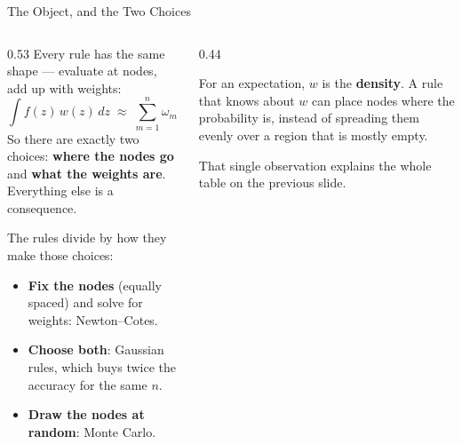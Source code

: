 \begin{frame}{The Object, and the Two Choices}
\begin{columns}[T]
\begin{column}{0.53\textwidth}
\small
Every rule has the same shape --- evaluate at nodes, add up with weights:
\[
  \int f(z)\,w(z)\,dz \;\approx\; \sum_{m=1}^{n} \omega_m\, f(z_m).
\]
So there are exactly two choices: \textbf{where the nodes go} and \textbf{what the weights are}. Everything else is a consequence.
\medskip

The rules divide by how they make those choices:
\begin{itemize}\footnotesize
  \item \textbf{Fix the nodes} (equally spaced) and solve for weights: Newton--Cotes.
  \item \textbf{Choose both}: Gaussian rules, which buys twice the accuracy for the same $n$.
  \item \textbf{Draw the nodes at random}: Monte Carlo.
\end{itemize}
\end{column}
\begin{column}{0.44\textwidth}
\begin{conceptbox}[title=\textbf{$w$ is the weight, and it matters}]\small
For an expectation, $w$ is the \textbf{density}. A rule that knows about $w$ can place nodes where the probability is, instead of spreading them evenly over a region that is mostly empty.
\end{conceptbox}
\medskip
\begin{examplebox}\footnotesize
That single observation explains the whole table on the previous slide.
\end{examplebox}
\end{column}
\end{columns}
\end{frame}

